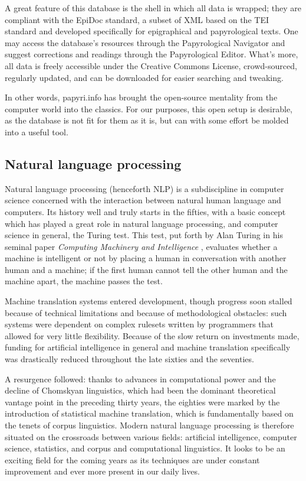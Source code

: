 \documentclass[10pt,a4paper,twoside,openright,titlepage,fleqn,%
               headinclude,,footinclude,BCOR5mm,%
               numbers=noenddot,cleardoublepage=empty,%
               tablecaptionabove]{scrbook}
\begin{document}
A great feature of this database is the shell in which all data is wrapped;
they are compliant with the EpiDoc standard, a subset of XML based on the TEI
standard and developed specifically for epigraphical and papyrological texts.
One may access the database’s resources through the Papyrological Navigator and
suggest corrections and readings through the Papyrological Editor. What’s more,
all data is freely accessible under the Creative Commons License,
crowd-sourced, regularly updated, and can be downloaded for easier searching
and tweaking.

In other words, papyri.info has brought the open-source mentality from the
computer world into the classics. For our purposes, this open setup is
desirable, as the database is not fit for them as it is, but can with some
effort be molded into a useful tool.

\subsection{Natural language processing} 

Natural language processing (henceforth NLP) is a subdiscipline in computer
science concerned with the interaction between natural human language and
computers. Its history well and truly starts in the fifties, with a basic
concept which has played a great role in natural language processing, and
computer science in general, the Turing test. This test, put forth by Alan
Turing in his seminal paper \textit{Computing Machinery and Intelligence}
\citep{turing1950}, evaluates whether a machine is intelligent or not by
placing a human in conversation with another human and a machine; if the first
human cannot tell the other human and the machine apart, the machine passes the test.

Machine translation systems entered development, though progress soon stalled
because of technical limitations and because of methodological obstacles: such
systems were dependent on complex rulesets written by programmers that allowed
for very little flexibility. Because of the slow return on investments made,
funding for artificial intelligence in general and machine translation
specifically was drastically reduced throughout the late sixties and the seventies.

A resurgence followed: thanks to advances in computational power and the
decline of Chomskyan linguistics, which had been the dominant theoretical
vantage point in the preceding thirty years, the eighties were marked by the
introduction of statistical machine translation, which is fundamentally based
on the tenets of corpus linguistics. Modern natural language processing is
therefore situated on the crossroads between various fields: artificial
intelligence, computer science, statistics, and corpus and computational
linguistics. It looks to be an exciting field for the coming years as its
techniques are under constant improvement and ever more present in our daily lives.
\end{document}
